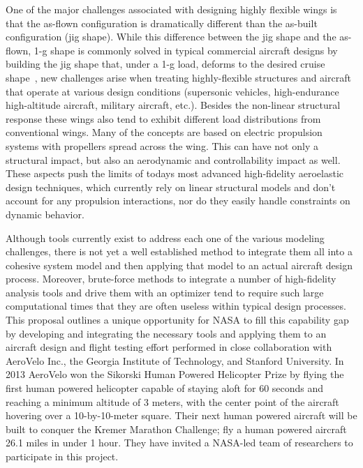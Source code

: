 \documentclass[]{aiaa-tc}
\begin{document}
    One of the major challenges associated with designing highly flexible wings is that the as-flown configuration 
    is dramatically different than the as-built configuration (jig shape). While this difference between the jig shape and the as-flown, 1-g shape is commonly solved in typical commercial aircraft designs by building the jig shape that, under a 1-g load, deforms to the desired cruise shape~\cite{Kennedy:2014:tacs-tripan, Kennedy:2012:CMC, 
      Kennedy:2014:High-aspect-ratio}, new challenges arise when treating highly-flexible
    structures and aircraft that operate at various design conditions (supersonic vehicles, high-endurance high-altitude aircraft, military aircraft, etc.). Besides the non-linear structural 
    response these wings also tend to exhibit different load distributions from conventional wings. Many of the concepts 
    are based on electric propulsion systems with propellers spread across the wing. This can have not only a 
    structural impact, but also an aerodynamic and controllability impact as well. These aspects push the 
    limits of todays most advanced high-fidelity aeroelastic design techniques, which currently rely on linear structural 
    models and don't account for any propulsion interactions, nor do they easily handle constraints on dynamic behavior. 

    Although tools currently exist to address each one of the various modeling challenges, there is not yet a well 
    established method to integrate them all into a cohesive system model and then applying that model to an actual 
    aircraft design process. Moreover, brute-force methods to integrate a number of high-fidelity analysis tools and drive them with an optimizer tend to require such large computational times that they are often useless within typical design processes.  This proposal outlines a unique opportunity for NASA to fill this capability gap
    by developing and integrating the necessary tools and applying them to an aircraft design and flight testing effort performed in close collaboration with AeroVelo Inc., the Georgia 
    Institute of Technology, and Stanford University. In 2013 AeroVelo won the Sikorski Human Powered Helicopter Prize by flying the first human powered helicopter capable of staying aloft for 60 seconds and reaching a minimum altitude of 3 meters, with the center point of the aircraft hovering over a 10-by-10-meter square. 
    Their next human powered aircraft will be built to conquer the Kremer Marathon Challenge; fly a 
    human powered aircraft 26.1 miles in under 1 hour. They have invited a NASA-led team of researchers to 
    participate in this project. 
\end{document}
